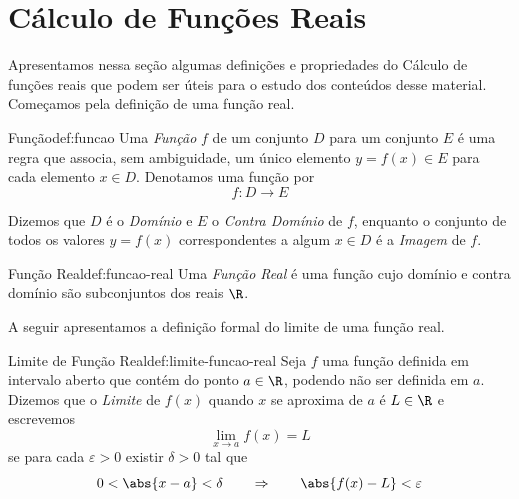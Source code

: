 \section{Cálculo de Funções Reais}
\label{sec:Derivacao_Integracao}

Apresentamos nessa seção algumas definições e propriedades do Cálculo de
funções reais que podem ser úteis para o estudo dos conteúdos desse material.
Começamos pela definição de uma função real.

\begin{definicao}{Função}{def:funcao}
  Uma \emph{Função} $f$ de um conjunto $D$ para um conjunto $E$
  é uma regra que associa, sem ambiguidade, um único elemento $y=f(x)\in E$
  para cada elemento $x\in D$. Denotamos uma função por
  \[
    f: D \to E
  \]
\end{definicao}

Dizemos que $D$ é o \emph{Domínio} e $E$ o
\emph{Contra Domínio} de $f$, enquanto o
conjunto de todos os valores $y=f(x)$ correspondentes a algum $x\in D$ é
a \emph{Imagem} de $f$.

\begin{definicao}{Função Real}{def:funcao-real}
  Uma \emph{Função Real} é uma função cujo domínio e
  contra domínio são subconjuntos dos reais $\R$.
\end{definicao}

A seguir apresentamos a definição formal do limite de uma função real.

\begin{definicao}{Limite de Função Real}{def:limite-funcao-real}
  Seja $f$ uma função definida em intervalo aberto que contém do ponto $a\in\R$,
  podendo não ser definida em $a$. Dizemos que o \emph{Limite}
  de $f(x)$ quando $x$ se aproxima de $a$ é $L\in\R$ e escrevemos
  \[
    \lim_{x\to a} f(x) = L
  \]
  se para cada $\varepsilon>0$ existir $\delta>0$ tal que
  \[
    0 < \abs{x-a} < \delta \qquad\Rightarrow\qquad \abs{f(x)-L} < \varepsilon
  \]
\end{definicao}

